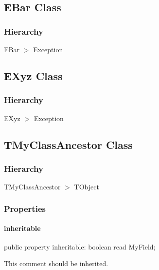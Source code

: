 \documentclass{report}
\begin{document}
\subsection*{EBar Class}
\subsubsection*{\large{\textbf{Hierarchy}}\normalsize\hspace{1ex}\hfill}
EBar {$>$} Exception
\subsection*{EXyz Class}
\subsubsection*{\large{\textbf{Hierarchy}}\normalsize\hspace{1ex}\hfill}
EXyz {$>$} Exception
\subsection*{TMyClassAncestor Class}
\subsubsection*{\large{\textbf{Hierarchy}}\normalsize\hspace{1ex}\hfill}
TMyClassAncestor {$>$} TObject
\subsubsection*{\large{\textbf{Properties}}\normalsize\hspace{1ex}\hfill}
\paragraph*{inheritable}\hspace*{\fill}

\begin{list}{}{
\setlength{\itemindent}{0cm}
\setlength{\listparindent}{0cm}
\setlength{\leftmargin}{\evensidemargin}
\addtolength{\leftmargin}{\tmplength}
\settowidth{\labelsep}{X}
\addtolength{\leftmargin}{\labelsep}
\setlength{\labelwidth}{\tmplength}
}
\begin{flushleft}
\item[\textbf{Declaration}\hfill]
\begin{ttfamily}
public property inheritable: boolean read MyField;\end{ttfamily}


\end{flushleft}
\par
\item[\textbf{Description}]
This comment should be inherited.

\end{list}
\end{document}
